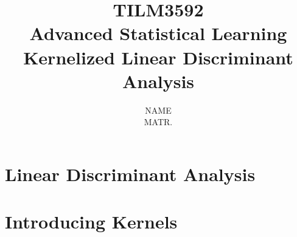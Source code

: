 \documentclass[a4paper, 12pt]{scrartcl}
\title{{\Large \textbf{TILM3592\\Advanced Statistical Learning}}\\
	{\LARGE \textbf{Kernelized Linear Discriminant Analysis}}\\}
\author{{\large NAME}\\
{ MATR.}}
\date{}
\begin{document}
\maketitle


\section{Linear Discriminant Analysis}

\section{Introducing Kernels}
\end{document}
